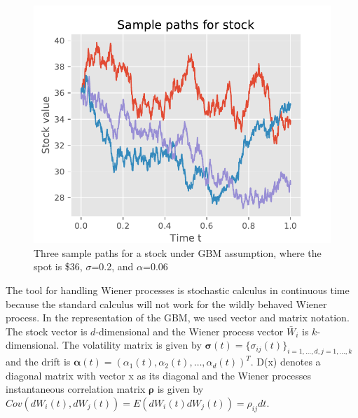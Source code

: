 \begin{figure}[th]
\centering
\includegraphics{Figures/samplePath.pdf}
\decoRule
\caption[Sample Path for Stocks]{Three sample paths for a stock under GBM assumption, where the spot is \$36, $\sigma$=0.2, and $\alpha$=0.06}
\label{fig:BM}
\end{figure}

The tool for handling Wiener processes is stochastic calculus in continuous time because the standard calculus will not work for the wildly behaved Wiener process. In the representation of the GBM, we used vector and matrix notation. The stock vector is $d$-dimensional and the Wiener process vector $\bar{W}_i$ is $k$-dimensional. The volatility matrix is given by $\bm{\sigma}(t)=\{\sigma_{ij}(t)\}_{i=1,\ldots,d,j=1,\ldots,k}$ and the drift is $\bm{\alpha}(t)=(\alpha_1(t), \alpha_2(t), \ldots, \alpha_d(t))^T$. D(x) denotes a diagonal matrix with vector x as its diagonal and the Wiener processes instantaneous correlation matrix $\bm{\rho}$ is given by $Cov(dW_i(t),dW_j(t))=E(dW_i(t)dW_j(t))=\rho_{ij}dt$.

